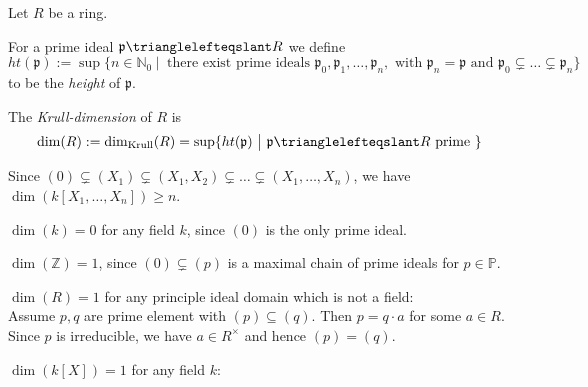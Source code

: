 \documentclass[11pt]{book}
\theoremstyle{nonumberbreak}
\newenvironment{defin}[1][]{\ifthenelse{\equal{#1}{}}{\definition}{\definition[#1]}\rm}{\enddefinition}
\newenvironment{ex}[1][]{\ifthenelse{\equal{#1}{}}{\example}{\example[#1]}\rm}{\endexample}
\begin{document}
\begin{spacing}{1.3}
\begin{defin} %
Let $R$ be a ring.
\begin{compactenum}
\item For a prime ideal $\mathfrak{p} \trianglelefteqslant R$ we define
$$ht(\mathfrak{p}):=\sup\{n \in \mathbb{N}_0 \ \big \vert\ \textrm{ there exist prime ideals } \mathfrak{p}_0, \mathfrak{p}_1, \ldots, \mathfrak{p}_n, \textrm{ with } \mathfrak{p}_n=\mathfrak{p} \textrm{ and } \mathfrak{p}_0 \subsetneq \ldots \subsetneq \mathfrak{p}_n\}$$
to be the \textit{height} of $\mathfrak{p}$.
\item The \textit{Krull-dimension} of $R$ is
$$\dim(R):=\dim_{\textrm{Krull}}(R)= \sup\{ht(\mathfrak{p}) \ \big \vert\ \mathfrak{p} \trianglelefteqslant R \textrm{ prime }\}$$
\end{compactenum}
\end{defin}

\begin{ex}
\begin{compactenum}
\item Since $( 0 ) \subsetneq ( X_1 ) \subsetneq ( X_1, X_2 ) \subsetneq \ldots \subsetneq ( X_1, \ldots, X_n )$, we have $\dim\left(k[X_1, \ldots, X_n]\right) \geqslant n$.\item $\dim(k)=0$ for any field $k$, since $( 0 )$ is the only prime ideal.
\item $\dim(\mathbb{Z})=1$, since $( 0 ) \subsetneq ( p )$ is a maximal chain of prime ideals for $p \in \mathbb{P}$.
\item $\dim(R) =1$ for any principle ideal domain which is not a field:\\
Assume $p,q$ are prime element with $( p ) \subseteq ( q )$. Then $p=q \cdot a$ for some $a \in R$. Since $p$ is irreducible, we have $a \in R^{\times}$ and hence $( p ) = ( q )$.
\item $\dim(k[X])=1$ for any field $k$: 
\end{compactenum}
\end{ex}




\end{spacing}
\end{document}
